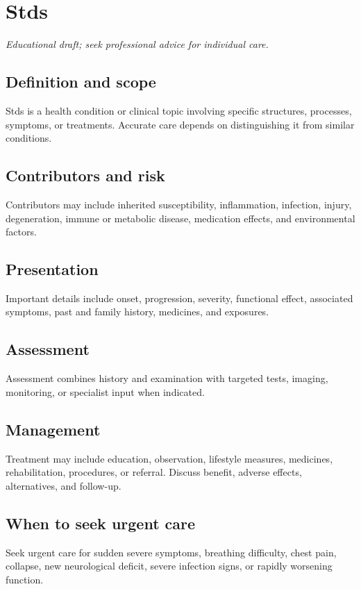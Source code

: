 \chapter{Stds}
\medskip
\noindent\textit{Educational draft; seek professional advice for individual care.}

\section*{Definition and scope}
Stds is a health condition or clinical topic involving specific structures, processes, symptoms, or treatments. Accurate care depends on distinguishing it from similar conditions.

\section*{Contributors and risk}
Contributors may include inherited susceptibility, inflammation, infection, injury, degeneration, immune or metabolic disease, medication effects, and environmental factors.

\section*{Presentation}
Important details include onset, progression, severity, functional effect, associated symptoms, past and family history, medicines, and exposures.

\section*{Assessment}
Assessment combines history and examination with targeted tests, imaging, monitoring, or specialist input when indicated.

\section*{Management}
Treatment may include education, observation, lifestyle measures, medicines, rehabilitation, procedures, or referral. Discuss benefit, adverse effects, alternatives, and follow-up.

\section*{When to seek urgent care}
Seek urgent care for sudden severe symptoms, breathing difficulty, chest pain, collapse, new neurological deficit, severe infection signs, or rapidly worsening function.


